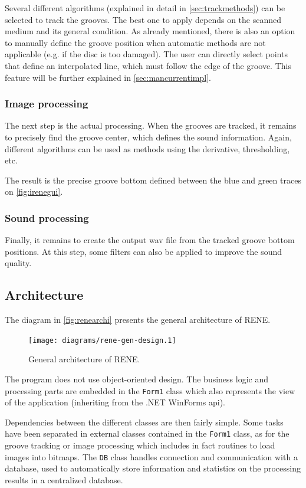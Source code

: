 Several different algorithms (explained in detail in \autoref{sec:trackmethods}) can be selected to track the grooves. The best one to apply depends on the scanned medium and its general condition. As already mentioned, there is also an option to manually define the groove position when automatic methods are not applicable (e.g. if the disc is too damaged). The user can directly select points that define an interpolated line, which must follow the edge of the groove. This feature will be further explained in \autoref{sec:mancurrentimpl}.

\subsubsection{Image processing}

The next step is the actual processing. When the grooves are tracked, it remains to precisely find the groove center, which defines the sound information. Again, different algorithms can be used as methods using the derivative, thresholding, etc.

The result is the precise groove bottom defined between the blue and green traces on \autoref{fig:irenegui}.

\subsubsection{Sound processing}

Finally, it remains to create the output \gls{wav} file from the tracked groove bottom positions. At this step, some filters can also be applied to improve the sound quality.

\subsection{Architecture}

The diagram in \autoref{fig:renearchi} presents the general architecture of RENE.

\begin{figure}[!ht]
\centering
\texttt{[image: diagrams/rene-gen-design.1]}
\caption{General architecture of RENE.}
\label{fig:renearchi}
\end{figure}

The program does not use object-oriented design. The business logic and processing parts are embedded in the \texttt{Form1} class which also represents the view of the application (inheriting from the .NET WinForms \gls{api}).

Dependencies between the different classes are then fairly simple. Some tasks have been separated in external classes contained in the \texttt{Form1} class, as for the groove tracking or image processing which includes in fact routines to load images into bitmaps. The \texttt{DB} class handles connection and communication with a database, used to automatically store information and statistics on the processing results in a centralized database.

